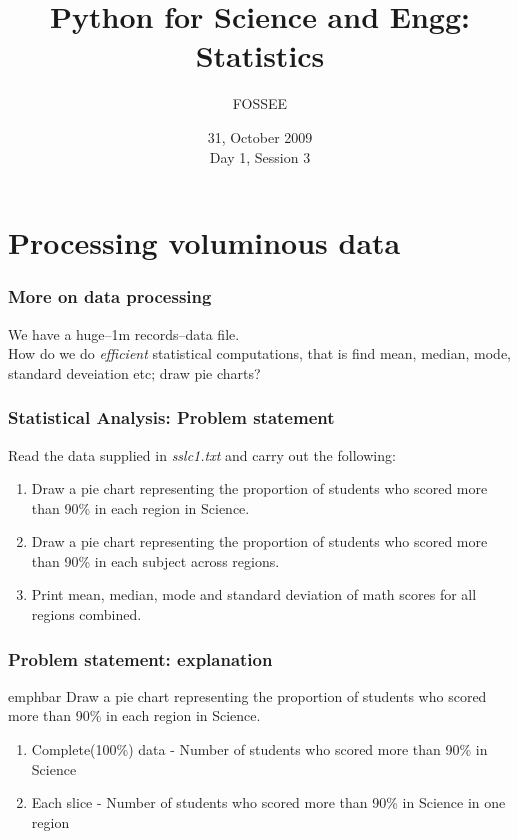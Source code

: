 \documentclass[14pt,compress]{beamer}
\title[Statistics]{Python for Science and Engg: Statistics}
\author[FOSSEE] {FOSSEE}
\institute[IIT Bombay] {Department of Aerospace Engineering\\IIT Bombay}
\date[] {31, October 2009\\Day 1, Session 3}
\newcommand{\emphbar}[1]
{\begin{beamercolorbox}[rounded=true]{emphbar} 
      {#1}
 \end{beamercolorbox}
}
\begin{document}
\begin{frame}
  \maketitle
\end{frame}


\section{Processing voluminous data}
\begin{frame}
  \frametitle{More on data processing}
  \begin{block}{}
    We have a huge--1m records--data file.\\How do we do \emph{efficient} statistical computations, that is find mean, median, mode, standard deveiation etc; draw pie charts?
  \end{block}
\end{frame}


\begin{frame}
  \frametitle{Statistical Analysis: Problem statement}
  Read the data supplied in \emph{sslc1.txt} and carry out the following:
  \begin{enumerate}
    \item Draw a pie chart representing the proportion of students who scored more than 90\% in each region in Science.
    \item Draw a pie chart representing the proportion of students who scored more than 90\% in each subject across regions.
    \item Print mean, median, mode and standard deviation of math scores for all regions combined.
  \end{enumerate}
\end{frame}

\begin{frame}
  \frametitle{Problem statement: explanation}
    \emphbar{Draw a pie chart representing the proportion of students who scored more than 90\% in each region in Science.}
    \begin{enumerate}
      \item Complete(100\%) data - Number of students who scored more than 90\% in Science
      \item Each slice - Number of students who scored more than 90\% in Science in one region
    \end{enumerate}
\end{frame}
\end{document}
